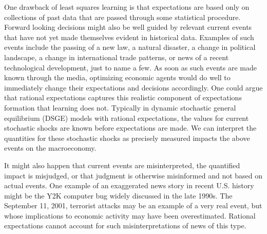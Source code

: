 \documentclass[10pt]{article}
\begin{document}
One drawback of least squares learning is that expectations are based only on collections of past data that are passed through some statistical procedure.  Forward looking decisions might also be well guided by relevant current events that have not yet made themselves evident in historical data.  Examples of such events include the passing of a new law, a natural disaster, a change in political landscape, a change in international trade patterns, or news of a recent technological development, just to name a few.  As soon as such events are made known through the media, optimizing economic agents would do well to immediately change their expectations and decisions accordingly.  One could argue that rational expectations captures this realistic component of expectations formation that learning does not.  Typically in dynamic stochastic general equilibrium (DSGE) models with rational expectations, the values for current stochastic shocks are known before expectations are made.  We can interpret the quantities for these stochastic shocks as precisely measured impacts the above events on the macroeconomy.

It might also happen that current events are misinterpreted, the quantified impact is misjudged, or that judgment is otherwise misinformed and not based on actual events.  One example of an exaggerated news story in recent U.S. history might be the Y2K computer bug widely discussed in the late 1990s.  The September 11, 2001, terrorist attacks may be an example of a very real event, but whose implications to economic activity may have been overestimated.  Rational expectations cannot account for such misinterpretations of news of this type.  
\end{document}
